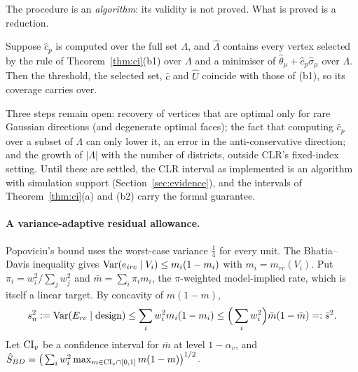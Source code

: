 The procedure is an \emph{algorithm}: its validity is not proved. What is proved
is a reduction.

\begin{lemma}\label{lem:reduction}
Suppose $\hat c_p$ is computed over the full set $\Lambda$, and $\hat\Lambda$
contains every vertex selected by the rule of Theorem~\ref{thm:ci}(b1) over
$\Lambda$ and a minimiser of $\hat\theta_\mu+\hat c_p\hat\sigma_\mu$ over $\Lambda$.
Then the threshold, the selected set, $\hat c$ and $\hat U$ coincide with those of
(b1), so its coverage carries over.
\end{lemma}
\begin{reading}
Three steps remain open: recovery of vertices that are optimal only for rare
Gaussian directions (and degenerate optimal faces); the fact that computing
$\hat c_p$ over a subset of $\Lambda$ can only lower it, an error in the
anti-conservative direction; and the growth of $|\Lambda|$ with the number of
districts, outside CLR's fixed-index setting. Until these are settled, the CLR
interval as implemented is an algorithm with simulation support
(Section~\ref{sec:evidence}), and the intervals of Theorem~\ref{thm:ci}(a) and
(b2) carry the formal guarantee.
\end{reading}

\paragraph{A variance-adaptive residual allowance.} Popoviciu's bound uses the
worst-case variance $\tfrac14$ for every unit. The Bhatia--Davis inequality
\citep{bhatiadavis2000} gives $\operatorname{Var}(e_{irc}\mid V_i)\le m_i(1-m_i)$ with
$m_i=m_{rc}(V_i)$. Put $\pi_i=w_i^2/\sum_jw_j^2$ and $\bar m=\sum_i\pi_im_i$, the
$\pi$-weighted model-implied rate, which is itself a linear target. By concavity of
$m(1-m)$,
\[
s_n^2:=\operatorname{Var}(E_{rc}\mid\text{design})\le\sum_iw_i^2m_i(1-m_i)\le\Big(\sum_iw_i^2\Big)\bar m(1-\bar m)=:\bar s^2 .
\]
Let $\mathrm{CI}_v$ be a confidence interval for $\bar m$ at level $1-\alpha_v$, and
$\hat S_{BD}=\big(\sum_iw_i^2\max_{m\in\mathrm{CI}_v\cap[0,1]}m(1-m)\big)^{1/2}$.

